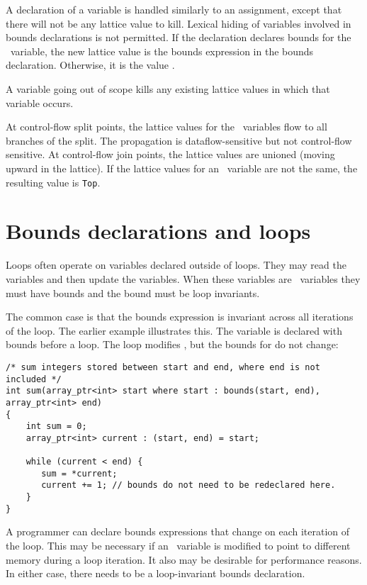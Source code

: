 A declaration of a variable is handled similarly to an assignment,
except that there will not be any lattice value to kill. Lexical hiding
of variables involved in bounds declarations is not permitted. If the
declaration declares bounds for the \arrayptr\ variable, the
new lattice value is the bounds expression in the bounds declaration.
Otherwise, it is the value \boundsunknown.

A variable going out of scope kills any existing lattice values in which
that variable occurs.

At control-flow split points, the lattice values for the
\arrayptr\ variables flow to all branches of the split. The
propagation is dataflow-sensitive but not control-flow sensitive. At
control-flow join points, the lattice values are unioned (moving upward
in the lattice). If the lattice values for an \arrayptr\
variable are not the same, the resulting value is \texttt{Top}.

\section{Bounds declarations and loops}

Loops often operate on variables declared outside of loops. They may
read the variables and then update the variables. When these variables
are \arrayptr\ variables they must have bounds and the bound
must be loop invariants.

The common case is that the bounds expression is invariant across all
iterations of the loop. The earlier \code{sum} example illustrates
this. The variable  is declared with bounds before a
loop. The loop modifies , but the bounds for
\code{current} do not change:

\begin{lstlisting}
/* sum integers stored between start and end, where end is not included */
int sum(array_ptr<int> start where start : bounds(start, end), array_ptr<int> end)
{
    int sum = 0;
    array_ptr<int> current : (start, end) = start;

    while (current < end) {
       sum = *current;
       current += 1; // bounds do not need to be redeclared here.
    }
}
\end{lstlisting}

A programmer can declare bounds expressions that change on each
iteration of the loop. This may be necessary if an \arrayptr\
variable is modified to point to different memory during a loop
iteration. It also may be desirable for performance reasons. In either
case, there needs to be a loop-invariant bounds declaration.

